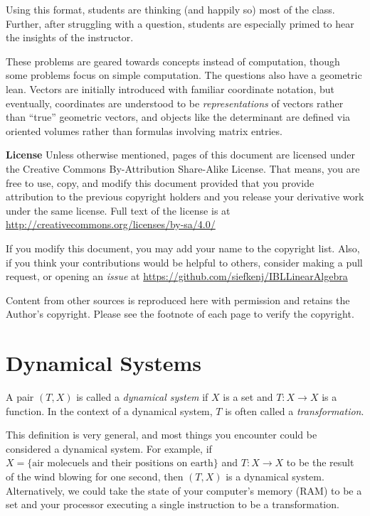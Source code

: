 {Using this format, students are thinking (and happily so) most of the class. Further,
after struggling with a question, students are especially primed to hear the insights of the instructor.

These problems are geared towards concepts instead of computation, though some problems
focus on simple computation. The questions also have a geometric lean. Vectors are initially
introduced with familiar coordinate notation, but eventually, coordinates are understood to be
\emph{representations} of vectors rather than ``true'' geometric vectors, and objects like the
determinant are defined via oriented volumes rather than formulas involving matrix entries.

\bigskip
{\bf License} Unless otherwise mentioned, pages of this document are licensed under
the Creative Commons By-Attribution Share-Alike License. That means, you are free
to use, copy, and modify this document provided that you provide attribution to the
previous copyright holders and you release your derivative work under the same license.
Full text of the license is at \url{http://creativecommons.org/licenses/by-sa/4.0/}

If you modify this document, you may add your name to the copyright list. Also,
if you think your contributions would be helpful to others, consider making a
pull request, or opening an \emph{issue} at \url{https://github.com/siefkenj/IBLLinearAlgebra}

Content from other sources is reproduced here with permission and retains the
Author's copyright. Please see the footnote of each page to verify the
copyright.

\newpage
}


\setcounter{page}{1}
\pagestyle{siefken}



	\section*{Dynamical Systems}

	\begin{definition}
		A pair $(T,X)$ is called a \emph{dynamical system} if
		$X$ is a set and $T:X\to X$ is a function. In the context of
		a dynamical system, $T$ is often called a \emph{transformation}.
	\end{definition}

	This definition is very general, and most things you encounter could be considered
	a dynamical system. For example, if $X=\{\text{air molecuels and their positions on earth}\}$
	and $T:X\to X$ to be the result of the wind blowing for one second, then $(T,X)$ is a dynamical system.
	Alternatively, we could take the state of your computer's memory (RAM) to be a set and your processor executing a single
	instruction to be a transformation.

